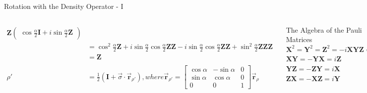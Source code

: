 \documentclass{beamer}
\begin{document}
\begin{frame}{Rotation with the Density Operator - I\tiny{\cite{rotationsonblochsphere}}}
{\begin{columns}
\begin{align*}
                  \mathbf{Z}
                  \begin{pmatrix} \cos\frac{\alpha}2\mathbf{I} + i\sin\frac{\alpha}2 \mathbf{Z} \end{pmatrix} \\
            &=    \cos^2\frac{\alpha}2 \mathbf{Z}
                + i\sin\frac{\alpha}2 \cos\frac{\alpha}2 \mathbf{Z}\mathbf{Z}
                - i\sin\frac{\alpha}2 \cos\frac{\alpha}2 \mathbf{Z}\mathbf{Z}
                + \sin^2\frac{\alpha}2 \mathbf{Z}\mathbf{Z}\mathbf{Z} \\
            &=    \mathbf{Z} \\
      \\
      \rho' &= \frac{1}2 ( \mathbf{I} + \overrightarrow{\sigma} \cdot \overrightarrow{\mathbf{r}}_{\rho'} )
            , where \overrightarrow{\mathbf{r}}_{\rho'} =
              \begin{bmatrix}
                \cos\alpha & -\sin\alpha & 0 \\
                \sin\alpha & \cos\alpha  & 0 \\
                0          & 0           & 1
              \end{bmatrix}
              \overrightarrow{\mathbf{r}}_{\rho}
    \end{align*}
    \begin{block}{The Algebra of the Pauli Matrices}
      $\mathbf{X}^2 = \mathbf{Y}^2 = \mathbf{Z}^2 = -i\mathbf{XYZ} = \mathbf{I}$ \\
      $\mathbf{XY} = -\mathbf{YX} = i\mathbf{Z}$ \\
      $\mathbf{YZ} = -\mathbf{ZY} = i\mathbf{X}$ \\
      $\mathbf{ZX} = -\mathbf{XZ} = i\mathbf{Y}$
    \end{block}
    \end{columns}
  }%
\end{frame}
\end{document}
